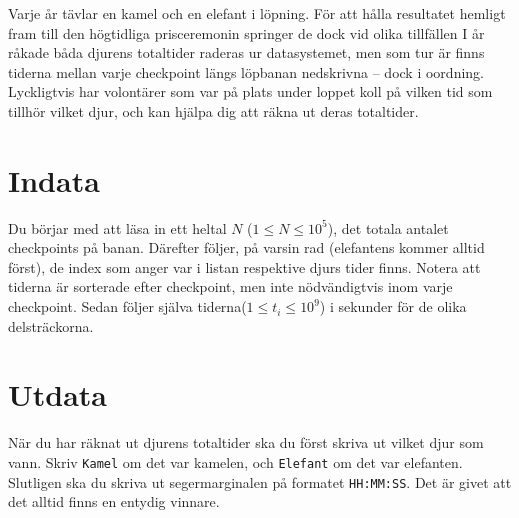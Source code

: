 Varje år tävlar en kamel och en elefant i löpning.
För att hålla resultatet hemligt fram till den högtidliga prisceremonin springer de dock vid olika tillfällen
I år råkade båda djurens totaltider raderas ur datasystemet, men som tur är finns tiderna mellan varje checkpoint längs löpbanan nedskrivna – dock i oordning.
Lyckligtvis har volontärer som var på plats under loppet koll på vilken tid som tillhör vilket djur, och kan hjälpa dig att räkna ut deras totaltider.

\section*{Indata}
Du börjar med att läsa in ett heltal $N$ ($1 \leq N \leq 10^5$), det totala antalet checkpoints på banan.
Därefter följer, på varsin rad (elefantens kommer alltid först), de index som anger var i listan respektive djurs tider finns.
Notera att tiderna är sorterade efter checkpoint, men inte nödvändigtvis inom varje checkpoint.
Sedan följer själva tiderna($1 \leq t_i \leq 10^9$) i sekunder för de olika delsträckorna.

\section*{Utdata}
När du har räknat ut djurens totaltider ska du först skriva ut vilket djur som vann.
Skriv \verb|Kamel| om det var kamelen, och \verb|Elefant| om det var elefanten.
Slutligen ska du skriva ut segermarginalen på formatet \verb|HH:MM:SS|.
Det är givet att det alltid finns en entydig vinnare.